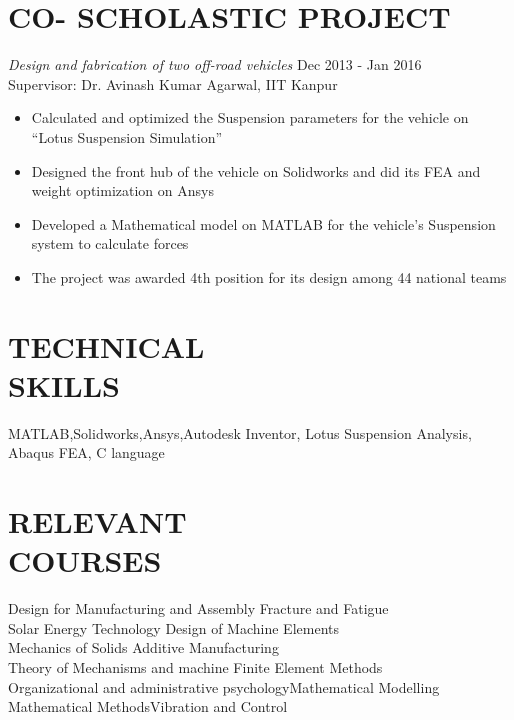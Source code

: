 \documentclass[margin, 10pt]{res} %
\begin{document}
\begin{resume}
\section{CO- SCHOLASTIC PROJECT} 
{\sl{Design and fabrication of two off-road vehicles}  } \hfill Dec 2013 - Jan 2016 \\
Supervisor: Dr. Avinash Kumar Agarwal, IIT Kanpur\\
\begin{itemize}
\item Calculated and optimized the Suspension parameters for the vehicle on “Lotus Suspension Simulation”
\item Designed the front hub of the vehicle on Solidworks and did its FEA and weight optimization on Ansys
\item Developed a Mathematical model on MATLAB for the vehicle's Suspension system to calculate forces 
\item The project was awarded 4th position for its design among 44 national teams 
\end{itemize}






\section{TECHNICAL \\ SKILLS} 

MATLAB,Solidworks,Ansys,Autodesk Inventor, Lotus Suspension Analysis, Abaqus FEA, C language\\

\section{RELEVANT \\ COURSES}
Design for Manufacturing and Assembly \hfill Fracture and Fatigue            \\
Solar Energy Technology \hfill Design of Machine Elements\\
Mechanics of Solids \hfill Additive Manufacturing\\
Theory of Mechanisms and machine \hfill Finite Element Methods\\
Organizational and administrative psychology\hfill Mathematical Modelling\\
Mathematical Methods\hfill Vibration and Control




\end{resume}
\end{document}
